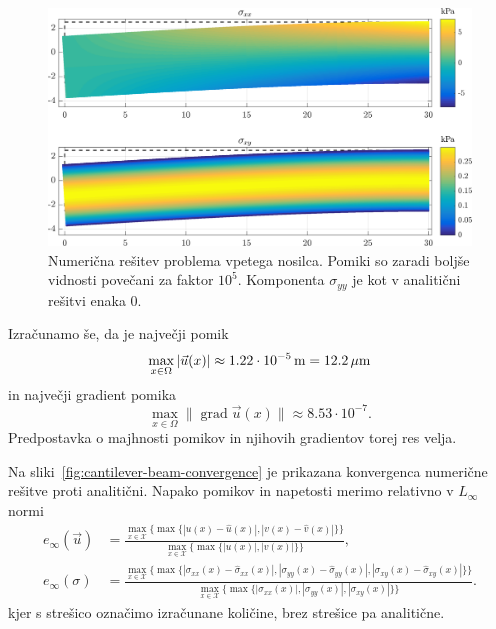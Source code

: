 \documentclass[12pt,a4paper,twoside]{article}
\theoremstyle{definition} %
\theoremstyle{plain} %
\numberwithin{equation}{section}
\newcommand{\X}{\mathcal{X}}
\newcommand{\grad}{\operatorname{grad}}
\newcommand{\vu}{\vec{u}}
\newcommand{\ts}{\sigma}
\newlength{\iw}
\begin{document}
\begin{figure}[h]
  \centering
  \includegraphics[width=\iw]{images/cantilever_beam_solution.png}
  \caption[Numerična rešitev problema vpetega nosilca.]{Numerična rešitev
  problema vpetega nosilca. Pomiki so zaradi boljše vidnosti povečani za faktor
  $10^5$. Komponenta $\ts_{yy}$ je kot v analitični rešitvi enaka 0.}
  \label{fig:cantilever-beam-solution}
\end{figure}
Izračunamo še, da je največji pomik
\begin{equation}
  \max_{x \in \Omega} |\vu(x)| \approx \unit[1.22 \cdot 10^{-5}]{m} = \unit[12.2]{\mu m}
\end{equation}
in največji gradient pomika
\begin{equation}
  \max_{x \in \Omega} \|\grad \vu(x)\| \approx 8.53 \cdot 10^{-7}.
\end{equation}
Predpostavka o majhnosti pomikov in njihovih gradientov torej res velja.

Na sliki~\ref{fig:cantilever-beam-convergence} je prikazana konvergenca numerične rešitve proti
analitični. Napako pomikov in napetosti merimo relativno v $L_\infty$ normi
\begin{align}
  e_\infty(\vu) &= \frac{\max_{x\in \X} \{\max\{|u(x)-\hat u(x)|, |v(x)-\hat v(x)|\}\}}
  {\max_{x\in \X} \{\max\{|u(x)|, |v(x)|\}\}}, \\
  e_\infty(\ts) &= \frac{\max_{x\in \X} \{\max\{|\sigma_{xx}(x)-\hat{\sigma}_{xx}(x)|,
  |\sigma_{yy}(x)-\hat{\sigma}_{yy}(x)|,
  |\sigma_{xy}(x)-\hat{\sigma}_{xy}(x)| \}\}}{
  \max_{x\in \X} \{\max\{|\sigma_{xx}(x)|, |\sigma_{yy}(x)|, |\sigma_{xy}(x)| \}\}}.
\end{align}
kjer s strešico označimo izračunane količine, brez strešice pa analitične.
\end{document}
